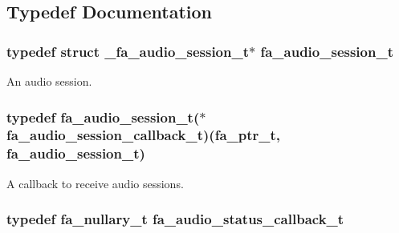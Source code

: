 \subsection{Typedef Documentation}
\hypertarget{group___fa_audio_session_ga62ee22268c23f1b18447141feccc01e0}{
\subsubsection[{fa\-\_\-audio\-\_\-session\-\_\-t}]{\setlength{\rightskip}{0pt plus 5cm}typedef struct \-\_\-fa\-\_\-audio\-\_\-session\-\_\-t$\ast$ {\bf fa\-\_\-audio\-\_\-session\-\_\-t}}}\label{group___fa_audio_session_ga62ee22268c23f1b18447141feccc01e0}


An audio session. 

\hypertarget{group___fa_audio_session_gafd8f3afd0f59b1df855bbc368c2ec419}{
\subsubsection[{fa\-\_\-audio\-\_\-session\-\_\-callback\-\_\-t}]{\setlength{\rightskip}{0pt plus 5cm}typedef {\bf fa\-\_\-audio\-\_\-session\-\_\-t}($\ast$  fa\-\_\-audio\-\_\-session\-\_\-callback\-\_\-t)({\bf fa\-\_\-ptr\-\_\-t}, {\bf fa\-\_\-audio\-\_\-session\-\_\-t})}}\label{group___fa_audio_session_gafd8f3afd0f59b1df855bbc368c2ec419}


A callback to receive audio sessions. 

\hypertarget{group___fa_audio_session_gaac3fa018078a475e6c5ed48efcbdb887}{
\subsubsection[{fa\-\_\-audio\-\_\-status\-\_\-callback\-\_\-t}]{\setlength{\rightskip}{0pt plus 5cm}typedef {\bf fa\-\_\-nullary\-\_\-t} {\bf fa\-\_\-audio\-\_\-status\-\_\-callback\-\_\-t}}}\label{group___fa_audio_session_gaac3fa018078a475e6c5ed48efcbdb887}


